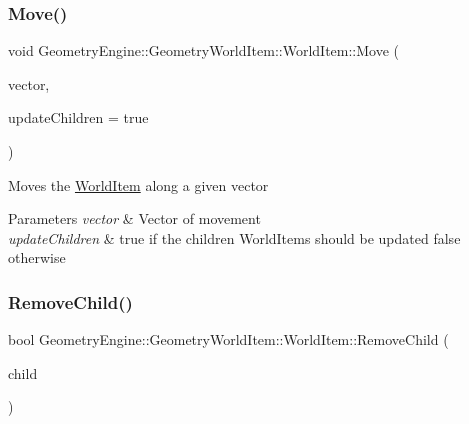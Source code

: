 \subsubsection{\texorpdfstring{Move()}{Move()}}
{\footnotesize\ttfamily void Geometry\+Engine\+::\+Geometry\+World\+Item\+::\+World\+Item\+::\+Move (\begin{DoxyParamCaption}\item[{const Q\+Vector3D \&}]{vector,  }\item[{bool}]{update\+Children = {\ttfamily true} }\end{DoxyParamCaption})}

Moves the \mbox{\hyperlink{class_geometry_engine_1_1_geometry_world_item_1_1_world_item}{World\+Item}} along a given vector 
\begin{DoxyParams}{Parameters}
{\em vector} & Vector of movement \\
\hline
{\em update\+Children} & true if the children World\+Items should be updated false otherwise \\
\hline
\end{DoxyParams}
\mbox{\label{class_geometry_engine_1_1_geometry_world_item_1_1_world_item_a7d73575daa22395164123b26d514f42a}} 
\subsubsection{\texorpdfstring{RemoveChild()}{RemoveChild()}}
{\footnotesize\ttfamily bool Geometry\+Engine\+::\+Geometry\+World\+Item\+::\+World\+Item\+::\+Remove\+Child (\begin{DoxyParamCaption}\item[{\mbox{\hyperlink{class_geometry_engine_1_1_geometry_world_item_1_1_world_item}{World\+Item}} $\ast$}]{child }\end{DoxyParamCaption})}

